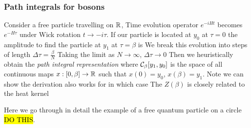 \documentclass{article}
\begin{document}
\subsubsection*{Path integrals for bosons}
Consider a free particle travelling on $\mathbb{R}$, Time evolution operator $e^{-iHt}$ becomes $e^{-H\tau}$ under Wick rotation $t\to -i\tau$. If our particle is located at $y_0$ at $\tau=0$ the amplitude to find the particle at $y_1$ at $\tau=\beta$ is 
We break this evolution into steps of length $\Delta \tau = \frac{\beta}{N}$ 
Taking the limit as $N\to\infty$, $\Delta \tau \to 0$
Then we heuristically obtain the \emph{path integral representation}
where $\mathcal{C}_\beta \lbrack y_1 , y_0 \rbrack $ is the space of all continuous maps $ x : \lbrack 0,\beta \rbrack \to \mathbb{R} $ such that $x(0)=y_0$, $x(\beta)=y_1$. Note we can show the derivation also works for
in which case 
The  $Z(\beta)$ is closely related to the heat kernel 
\begin{example}
	Here we go through in detail the example of a free quantum particle on a circle \hl{DO THIS}. 
\end{example}
\end{document}
